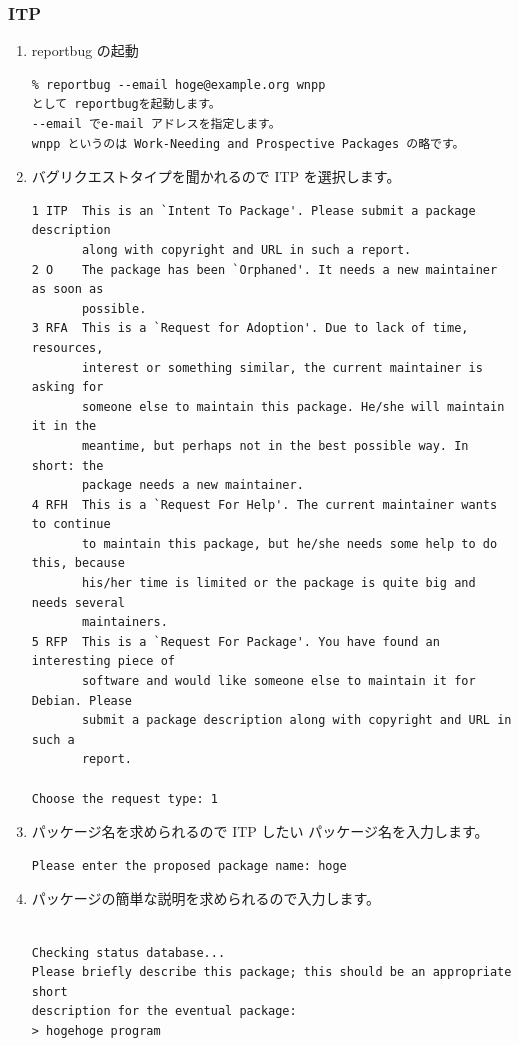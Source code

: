 \documentclass[mingoth,a4paper]{jsarticle}
\begin{document}
    \subsubsection{ ITP }
		\begin{enumerate}
        \item reportbug の起動
		\begin{verbatim}
% reportbug --email hoge@example.org wnpp
として reportbugを起動します。
--email でe-mail アドレスを指定します。
wnpp というのは Work-Needing and Prospective Packages の略です。
		\end{verbatim}
        \item バグリクエストタイプを聞かれるので ITP を選択します。
		\begin{verbatim}
1 ITP  This is an `Intent To Package'. Please submit a package description
       along with copyright and URL in such a report.
2 O    The package has been `Orphaned'. It needs a new maintainer as soon as
       possible.
3 RFA  This is a `Request for Adoption'. Due to lack of time, resources,
       interest or something similar, the current maintainer is asking for
       someone else to maintain this package. He/she will maintain it in the
       meantime, but perhaps not in the best possible way. In short: the
       package needs a new maintainer.
4 RFH  This is a `Request For Help'. The current maintainer wants to continue
       to maintain this package, but he/she needs some help to do this, because
       his/her time is limited or the package is quite big and needs several
       maintainers.
5 RFP  This is a `Request For Package'. You have found an interesting piece of
       software and would like someone else to maintain it for Debian. Please
       submit a package description along with copyright and URL in such a
       report.

Choose the request type: 1
\end{verbatim}

        \item パッケージ名を求められるので ITP したい パッケージ名を入力します。
		\begin{verbatim}
Please enter the proposed package name: hoge
		\end{verbatim}

        \item パッケージの簡単な説明を求められるので入力します。
		\begin{verbatim}

Checking status database...
Please briefly describe this package; this should be an appropriate short
description for the eventual package:
> hogehoge program
		\end{verbatim}


\end{enumerate}
\end{document}
